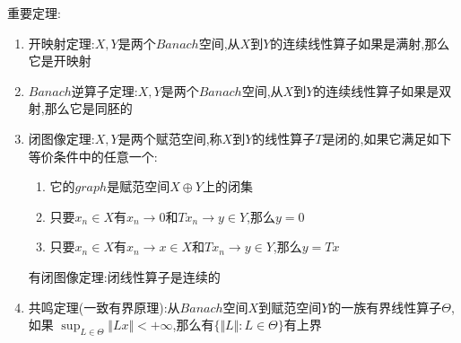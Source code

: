 重要定理:
\begin{enumerate}
  \item 开映射定理:$X,Y$是两个$Banach$空间,从$X$到$Y$的连续线性算子如果是满射,那么它是开映射
  \item $Banach$逆算子定理:$X,Y$是两个$Banach$空间,从$X$到$Y$的连续线性算子如果是双射,那么它是同胚的
  \item 闭图像定理:$X,Y$是两个赋范空间,称$X$到$Y$的线性算子$T$是闭的,如果它满足如下等价条件中的任意一个:
  \begin{enumerate}
  \item 它的$graph$是赋范空间$X\oplus Y$上的闭集
  \item 只要$x_n\in X$有$x_n\to0$和$Tx_n\to y\in Y$,那么$y=0$
  \item 只要$x_n\in X$有$x_n\to x\in X$和$Tx_n\to y\in Y$,那么$y=Tx$
  \end{enumerate}
  有闭图像定理:闭线性算子是连续的
  \item 共鸣定理(一致有界原理):从$Banach$空间$X$到赋范空间$Y$的一族有界线性算子$\Theta$,如果
  $\sup_{L\in\Theta}\Vert Lx\Vert<+\infty$,那么有$\{\Vert L\Vert:L\in\Theta\}$有上界
\end{enumerate}
